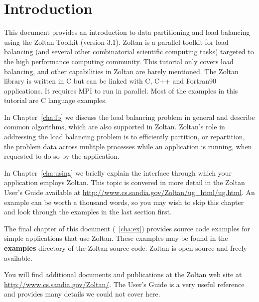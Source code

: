 %
%
%
\chapter{Introduction}

This document provides an introduction to data partitioning
and load balancing using the Zoltan Toolkit (version 3.1).
Zoltan is a parallel toolkit for load balancing
(and several other combinatorial scientific computing tasks)
targeted to the high performance computing community.
This tutorial only covers load balancing,
and other capabilities in Zoltan are barely mentioned.
The Zoltan library is written in C but can be
linked with C, C++ and Fortran90 applications.
It requires MPI to run in parallel.
Most of the examples in this tutorial are C language examples.

In Chapter~\ref{cha:lb} we
discuss the load balancing problem in general and describe
common algorithms, which are also supported in Zoltan.
Zoltan's role in addressing the load balancing problem is to
efficiently partition,
or repartition, the problem data across mulitple processes while an
application is running, when requested to do so by the application.


In Chapter~\ref{cha:using} we briefly explain the interface
through which your application employs Zoltan.  This topic is
convered in more detail in the
Zoltan User's Guide available at
\url{http://www.cs.sandia.gov/Zoltan/ug_html/ug.html}.
An example can be worth a thousand words, so you may wish to
skip this chapter and look through the examples in the last section first.

The final chapter of this document (~\ref{cha:ex}) provides
source code examples for simple applications that use Zoltan.
These examples may be found in the \textbf{examples} directory
of the Zoltan source code.  Zoltan is open source and freely available.

You will find additional documents and publications at the
Zoltan web site at \url{http://www.cs.sandia.gov/Zoltan/}.
The User's Guide is a very useful reference and provides
many details we could not cover here.

